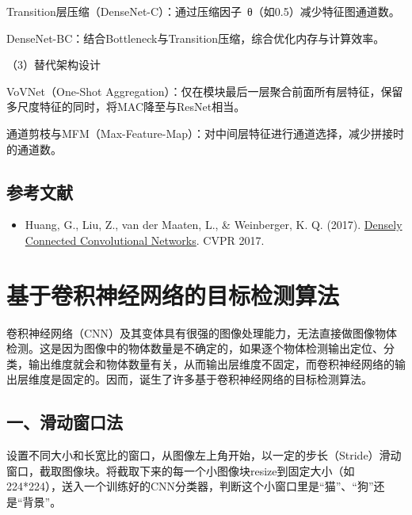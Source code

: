 Transition层压缩（DenseNet-C）：通过压缩因子~θ（如0.5）减少特征图通道数。

DenseNet-BC：结合Bottleneck与Transition压缩，综合优化内存与计算效率。

（3）替代架构设计\hspace{0pt}

VoVNet（One-Shot Aggregation）：仅在模块最后一层聚合前面所有层特征，保留多尺度特征的同时，将MAC降至与ResNet相当。

通道剪枝与MFM（Max-Feature-Map）：对中间层特征进行通道选择，减少拼接时的通道数。

\hypertarget{ux53c2ux8003ux6587ux732e-13}{%
\subsection{参考文献}\label{ux53c2ux8003ux6587ux732e-13}}

\begin{itemize}
\tightlist
\item
  Huang, G., Liu, Z., van der Maaten, L., \& Weinberger, K. Q. (2017). \href{https://arxiv.org/abs/1608.06993}{Densely Connected Convolutional Networks}. CVPR 2017.
\end{itemize}

\clearpage

\hypertarget{ux57faux4e8eux5377ux79efux795eux7ecfux7f51ux7edcux7684ux76eeux6807ux68c0ux6d4bux7b97ux6cd5}{%
\section{基于卷积神经网络的目标检测算法}\label{ux57faux4e8eux5377ux79efux795eux7ecfux7f51ux7edcux7684ux76eeux6807ux68c0ux6d4bux7b97ux6cd5}}

卷积神经网络（CNN）及其变体具有很强的图像处理能力，无法直接做图像物体检测。这是因为图像中的物体数量是不确定的，如果逐个物体检测输出定位、分类，输出维度就会和物体数量有关，从而输出层维度不固定，而卷积神经网络的输出层维度是固定的。因而，诞生了许多基于卷积神经网络的目标检测算法。

\hypertarget{ux4e00ux6ed1ux52a8ux7a97ux53e3ux6cd5}{%
\subsection{一、滑动窗口法}\label{ux4e00ux6ed1ux52a8ux7a97ux53e3ux6cd5}}

设置不同大小和长宽比的窗口，从图像左上角开始，以一定的步长（Stride）滑动窗口，截取图像块。将截取下来的每一个小图像块resize到固定大小（如224*224），送入一个训练好的CNN分类器，判断这个小窗口里是``猫''、``狗''还是``背景''。

